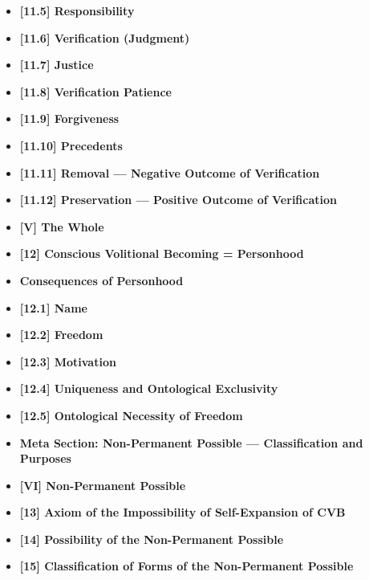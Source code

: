\documentclass[12pt]{article}
\begin{document}
\begin{itemize}
\item \textbf{[11.5] Responsibility}

\item \textbf{[11.6] Verification (Judgment)}

\item \textbf{[11.7] Justice}

\item \textbf{[11.8] Verification Patience}

\item \textbf{[11.9] Forgiveness}

\item \textbf{[11.10] Precedents}

\item \textbf{[11.11] Removal — Negative Outcome of Verification}

\item \textbf{[11.12] Preservation — Positive Outcome of Verification}

\item \textbf{[V] The Whole}

\item \textbf{[12] Conscious Volitional Becoming = Personhood}

\item \textbf{Consequences of Personhood}

\item \textbf{[12.1] Name}

\item \textbf{[12.2] Freedom}

\item \textbf{[12.3] Motivation}

\item \textbf{[12.4] Uniqueness and Ontological Exclusivity}

\item \textbf{[12.5] Ontological Necessity of Freedom}

\item \textbf{Meta Section: Non-Permanent Possible — Classification and Purposes}

\item \textbf{[VI] Non-Permanent Possible}

\item \textbf{[13] Axiom of the Impossibility of Self-Expansion of CVB}

\item \textbf{[14] Possibility of the Non-Permanent Possible}

\item \textbf{[15] Classification of Forms of the Non-Permanent Possible}


\end{itemize}
\end{document}
